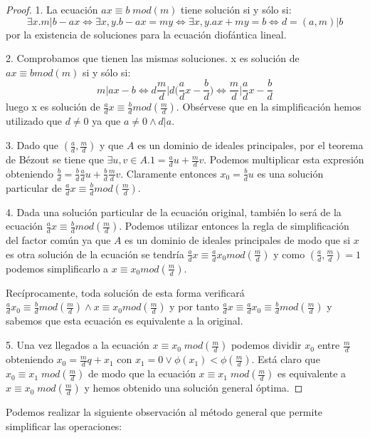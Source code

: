 \begin{proof}
1. La ecuación $ax \equiv b \; mod(m)$ tiene solución si y sólo si: $$\exists x. m | b-ax \iff \exists x,y. b-ax = my \iff \exists x,y.ax+my = b \iff d = (a,m) | b$$ por la existencia de soluciones para la ecuación diofántica lineal. 

2. Comprobamos que tienen las mismas soluciones. x es solución de $ax \equiv b mod(m)$ si y sólo si: $$m|ax-b \iff d\frac{m}{d}\Big|d\Big(\frac{a}{d}x-\frac{b}{d}\Big) \iff \frac{m}{d} \Big| \frac{a}{d}x-\frac{b}{d}$$ luego x es solución de $\frac{a}{d}x \equiv \frac{b}{d} mod(\frac{m}{d})$. Obsérvese que en la simplificación hemos utilizado que $d \neq 0$ ya que $a \neq 0 \land d|a$.

3. Dado que $(\frac{a}{d},\frac{m}{d})$ y que $A$ es un dominio de ideales principales, por el teorema de Bézout se tiene que $\exists u,v \in A. 1 = \frac{a}{d}u+\frac{m}{d}v$. Podemos multiplicar esta expresión obteniendo $\frac{b}{d} = \frac{b}{d}\frac{a}{d}u + \frac{b}{d}\frac{m}{d}v$. Claramente entonces $x_0 = \frac{b}{d}u$ es una solución particular de $\frac{a}{d}x \equiv \frac{b}{d} mod(\frac{m}{d})$. 

4. Dada una solución particular de la ecuación original, también lo será de la ecuación $\frac{a}{d}x \equiv \frac{b}{d} mod(\frac{m}{d})$. Podemos utilizar entonces la regla de simplificación del factor común ya que $A$ es un dominio de ideales principales de modo que si $x$ es otra solución de la ecuación se tendría $\frac{a}{d}x \equiv \frac{a}{d}x_0 mod(\frac{m}{d})$ y como $(\frac{a}{d},\frac{m}{d}) = 1$ podemos simplificarlo a $x \equiv x_0 mod(\frac{m}{d})$.

Recíprocamente, toda solución de esta forma verificará $\frac{a}{d}x_0 \equiv \frac{b}{d} mod(\frac{m}{d}) \land x \equiv x_0 mod(\frac{m}{d})$ y por tanto $\frac{a}{d}x \equiv \frac{a}{d}x_0 \equiv \frac{b}{d} mod(\frac{m}{d})$ y sabemos que esta ecuación es equivalente a la original.

5. Una vez llegados a la ecuación $x \equiv x_0 \; mod(\frac{m}{d})$ podemos dividir $x_0$ entre $\frac{m}{d}$ obteniendo $x_0 = \frac{m}{d}q + x_1$ con $x_1 = 0 \lor \phi(x_1) < \phi(\frac{m}{d})$.  Está claro que $x_0 \equiv x_1 \; mod(\frac{m}{d})$ de modo que la ecuación $x \equiv x_1 \; mod(\frac{m}{d})$ es equivalente a $x \equiv x_0 \; mod(\frac{m}{d})$ y hemos obtenido una solución general óptima. 
\end{proof}

Podemos realizar la siguiente observación al método general que permite simplificar las operaciones:

